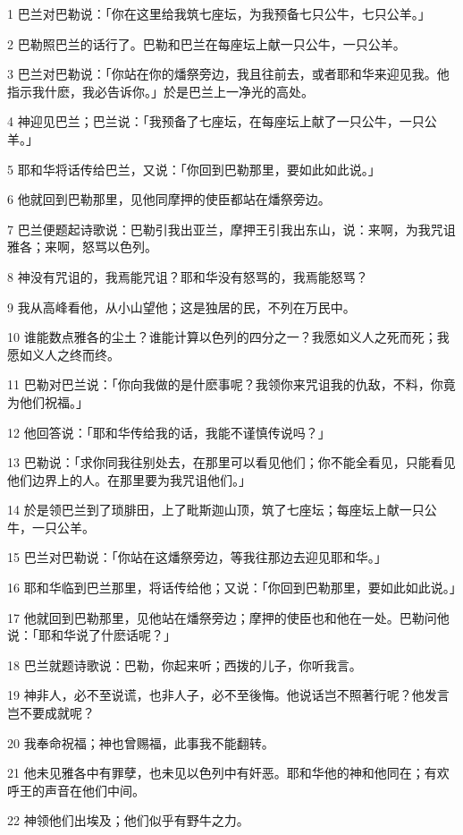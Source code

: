 \par 1 巴兰对巴勒说：「你在这里给我筑七座坛，为我预备七只公牛，七只公羊。」
\par 2 巴勒照巴兰的话行了。巴勒和巴兰在每座坛上献一只公牛，一只公羊。
\par 3 巴兰对巴勒说：「你站在你的燔祭旁边，我且往前去，或者耶和华来迎见我。他指示我什麽，我必告诉你。」於是巴兰上一净光的高处。
\par 4 神迎见巴兰；巴兰说：「我预备了七座坛，在每座坛上献了一只公牛，一只公羊。」
\par 5 耶和华将话传给巴兰，又说：「你回到巴勒那里，要如此如此说。」
\par 6 他就回到巴勒那里，见他同摩押的使臣都站在燔祭旁边。
\par 7 巴兰便题起诗歌说：巴勒引我出亚兰，摩押王引我出东山，说：来啊，为我咒诅雅各；来啊，怒骂以色列。
\par 8 神没有咒诅的，我焉能咒诅？耶和华没有怒骂的，我焉能怒骂？
\par 9 我从高峰看他，从小山望他；这是独居的民，不列在万民中。
\par 10 谁能数点雅各的尘土？谁能计算以色列的四分之一？我愿如义人之死而死；我愿如义人之终而终。
\par 11 巴勒对巴兰说：「你向我做的是什麽事呢？我领你来咒诅我的仇敌，不料，你竟为他们祝福。」
\par 12 他回答说：「耶和华传给我的话，我能不谨慎传说吗？」
\par 13 巴勒说：「求你同我往别处去，在那里可以看见他们；你不能全看见，只能看见他们边界上的人。在那里要为我咒诅他们。」
\par 14 於是领巴兰到了琐腓田，上了毗斯迦山顶，筑了七座坛；每座坛上献一只公牛，一只公羊。
\par 15 巴兰对巴勒说：「你站在这燔祭旁边，等我往那边去迎见耶和华。」
\par 16 耶和华临到巴兰那里，将话传给他；又说：「你回到巴勒那里，要如此如此说。」
\par 17 他就回到巴勒那里，见他站在燔祭旁边；摩押的使臣也和他在一处。巴勒问他说：「耶和华说了什麽话呢？」
\par 18 巴兰就题诗歌说：巴勒，你起来听；西拨的儿子，你听我言。
\par 19 神非人，必不至说谎，也非人子，必不至後悔。他说话岂不照著行呢？他发言岂不要成就呢？
\par 20 我奉命祝福；神也曾赐福，此事我不能翻转。
\par 21 他未见雅各中有罪孽，也未见以色列中有奸恶。耶和华他的神和他同在；有欢呼王的声音在他们中间。
\par 22 神领他们出埃及；他们似乎有野牛之力。
